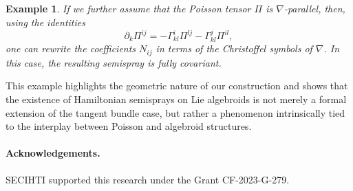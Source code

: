 \documentclass[12pt,letterpaper]{article}
\newtheorem{example}[theorem]{Example}
\numberwithin{equation}{section}
\begin{document}
\begin{example}
If we further assume that the Poisson tensor $\Pi$ is 
$\nabla$-parallel,
then, using the identities
\[
\partial_k \Pi^{ij} = - \Gamma^i_{kl} \Pi^{lj} - \Gamma^j_{kl} \Pi^{il},
\]
one can rewrite the coefficients $N_{ij}$ in terms of the Christoffel symbols of $\nabla$. 
In this case, the resulting semispray is fully covariant. 
\end{example}

This example highlights the geometric nature of our construction 
and shows that the existence of Hamiltonian semisprays on Lie algebroids is not merely a formal extension of the tangent bundle case, 
but rather a phenomenon intrinsically tied to the interplay between Poisson and algebroid structures.



\paragraph{Acknowledgements.} 
SECIHTI supported this research under the Grant CF-2023-G-279.
 
\end{document}
